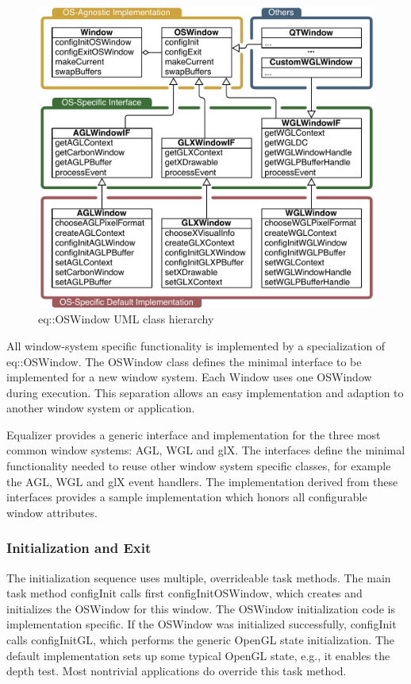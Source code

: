 \documentclass[10pt,a4]{scrartcl}
\begin{document}
\begin{figure}
  \includegraphics[width=.618\textwidth]{images/osWindow.pdf}
  {\caption{\small\label{fOSWindow}eq::OSWindow UML class hierarchy}}
\end{figure}
All window-system specific functionality is implemented by a
specialization of \textsf{eq::OS\-Window}. The \textsf{OSWindow} class
defines the minimal interface to be implemented for a new window
system. Each \textsf{Window} uses one \textsf{OSWindow} during
execution. This separation allows an easy implementation and adaption to
another window system or application.

Equalizer provides a generic interface and implementation for the three
most common window systems: AGL, WGL and glX. The interfaces define the
minimal functionality needed to reuse other window system specific
classes, for example the AGL, WGL and glX event handlers. The
implementation derived from these interfaces provides a sample
implementation which honors all configurable window attributes.

\subsubsection{Initialization and Exit}

The initialization sequence uses multiple, overrideable task
methods. The main task method \textsf{configInit} calls first
\textsf{configInitOSWindow}, which creates and initializes the
\textsf{OSWindow} for this window. The \textsf{OSWindow} initialization
code is implementation specific. If the \textsf{OSWindow} was
initialized successfully, \textsf{configInit} calls
\textsf{configInitGL}, which performs the generic OpenGL state
initialization. The default implementation sets up some typical OpenGL
state, e.g., it enables the depth test. Most nontrivial applications
do override this task method.
\end{document}
